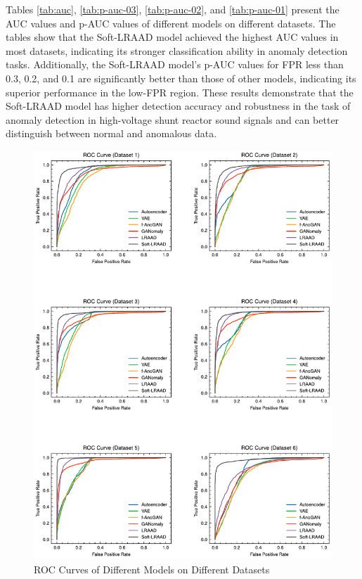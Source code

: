 \documentclass{article}
\begin{document}
Tables \ref{tab:auc}, \ref{tab:p-auc-03}, \ref{tab:p-auc-02}, and \ref{tab:p-auc-01} present the AUC values and p-AUC values of different models on different datasets. The tables show that the Soft-LRAAD model achieved the highest AUC values in most datasets, indicating its stronger classification ability in anomaly detection tasks. Additionally, the Soft-LRAAD model's p-AUC values for FPR less than 0.3, 0.2, and 0.1 are significantly better than those of other models, indicating its superior performance in the low-FPR region. These results demonstrate that the Soft-LRAAD model has higher detection accuracy and robustness in the task of anomaly detection in high-voltage shunt reactor sound signals and can better distinguish between normal and anomalous data.

\begin{figure}[H]
    \centering
    \includegraphics[width=\textwidth]{./roc_curve.pdf}
    \caption{ROC Curves of Different Models on Different Datasets}
    \label{fig:roc_curve}
\end{figure}
\end{document}
